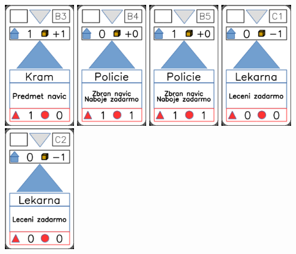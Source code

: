 \documentclass[a4paper]{article}
\begin{document}
	\includegraphics[width=3.0cm]{img-2_7}
	\includegraphics[width=3.0cm]{img-2_8}
	\includegraphics[width=3.0cm]{img-2_9}
	\includegraphics[width=3.0cm]{img-2_10}
	\includegraphics[width=3.0cm]{img-2_11}
\end{document}
